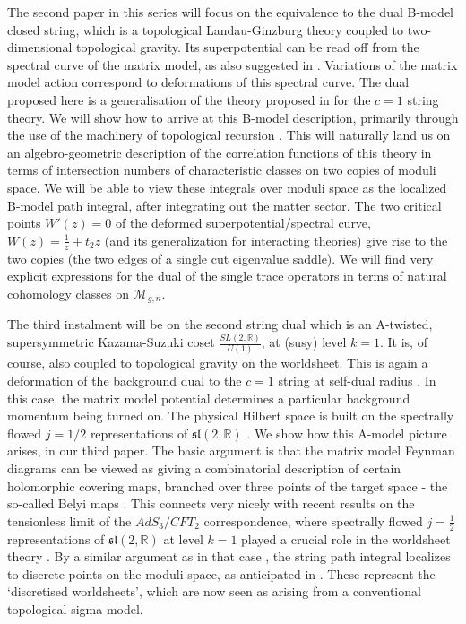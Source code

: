 \documentclass[english]{article}
\let\mc=\mathcal
\let\mb=\mathbb
\begin{document}
The second paper in this series \cite{DSDII} will focus on the equivalence to the dual B-model closed string, which is a topological Landau-Ginzburg theory coupled to two-dimensional topological gravity. Its superpotential can be read off from the spectral curve of the matrix model, as also suggested in \cite{Aganagic_2005}. Variations of the matrix model action correspond to deformations of this spectral curve. The dual proposed here is a generalisation of the theory proposed in \cite{ghoshalMukhiLG, hananyOzPlLG} for the $c=1$ string theory. We will show how to arrive at this B-model description, primarily through the use of the machinery of topological recursion \cite{Eynard:2007kz,eynard2008algebraic,eynard2bp}. This will naturally land us on an algebro-geometric description of the correlation functions of this theory in terms of intersection numbers of characteristic classes on two copies of moduli space. We will be able to view these integrals over moduli space as the localized B-model path integral, after integrating out the matter sector. The two critical points $W'(z)=0$ of the deformed superpotential/spectral curve, $W(z)=\frac{1}{z}+t_{2}z$ (and its generalization for interacting theories) give rise to the two copies (the two edges of a single cut eigenvalue saddle). We will find very explicit expressions for the dual of the single trace operators in terms of natural cohomology classes on $\mc{M}_{g,n}$.

The third instalment \cite{DSDIII} will be on the second string dual which is an A-twisted, supersymmetric Kazama-Suzuki coset $\frac{SL(2,\mb{R})}{U(1)}$, at (susy) level $k=1$. It is, of course, also coupled to topological gravity on the worldsheet. This is again a deformation of the background dual to the $c=1$ string at self-dual radius \cite{MukhiVafa}.  In this case, the matrix model potential determines a particular background momentum being turned on. The physical Hilbert space is built on the spectrally flowed $j=1/2$ representations of $\mathfrak{sl}(2, \mathbb{R})$ \cite{MOOgI}. We show how this A-model picture arises, in our third paper. The basic argument is that the matrix model Feynman diagrams can be viewed as giving a combinatorial description of certain holomorphic covering maps, branched over three points of the target space - the so-called Belyi maps \cite{bauer1993triangulations, koch2010matrix}. This connects very nicely with recent results on the tensionless limit of the $AdS_3/CFT_2$ correspondence, where  spectrally flowed $j=\frac{1}{2}$ representations of $\mathfrak{sl}(2,\mb{R})$ at level $k=1$ played a crucial role in the worldsheet theory \cite{eberhardt2020deriving, gaberdiel2021symmetric, eberhardt2019worldsheet}. By a similar argument as in that case \cite{eberhardt2020deriving, dei2021free}, the string path integral localizes to discrete points on the moduli space, as anticipated in \cite{aharony2007remarks, razamatGauss, gopakumar2011simplest}. These represent the `discretised worldsheets', which are now seen as arising from a conventional topological sigma model.   
\end{document}
